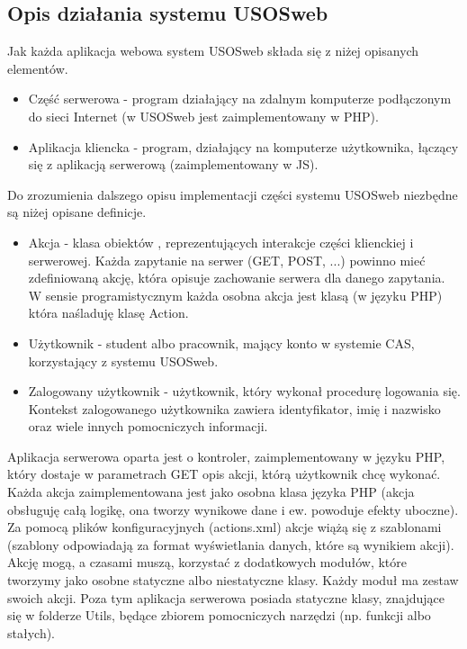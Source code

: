 \documentclass[licencjacka]{pracamgr}
\begin{document}
\subsection{Opis działania systemu USOSweb}
Jak każda aplikacja webowa system USOSweb składa się z niżej opisanych elementów.
\begin{itemize}
  \item
  Część serwerowa - program działający na zdalnym komputerze podłączonym do sieci Internet (w USOSweb jest zaimplementowany w PHP).
  \item
  Aplikacja kliencka - program, działający na komputerze użytkownika, łączący się z aplikacją serwerową (zaimplementowany w JS).
\end{itemize}


Do zrozumienia dalszego opisu implementacji części systemu USOSweb niezbędne są niżej opisane definicje.
\begin{itemize}
  \item
  Akcja - klasa obiektów , reprezentujących interakcje części klienckiej i serwerowej. Każda zapytanie na serwer (GET, POST, ...) powinno mieć zdefiniowaną akcję, która opisuje zachowanie serwera dla danego zapytania. W sensie programistycznym każda osobna akcja jest klasą (w języku PHP) która naśladuję klasę Action.
  \item
  Użytkownik - student albo pracownik, mający konto w systemie CAS, korzystający z systemu USOSweb.
  \item
  Zalogowany użytkownik - użytkownik, który wykonał procedurę logowania się. Kontekst zalogowanego użytkownika zawiera identyfikator, imię i nazwisko oraz wiele innych pomocniczych informacji. 
\end{itemize}

Aplikacja serwerowa oparta jest o kontroler, zaimplementowany w języku PHP, który dostaje w parametrach GET opis akcji, którą użytkownik chcę wykonać. Każda akcja zaimplementowana jest jako osobna klasa języka PHP (akcja obsługuję całą logikę, ona tworzy wynikowe dane i ew. powoduje efekty uboczne). Za pomocą plików konfiguracyjnych (actions.xml) akcje wiążą się z szablonami (szablony odpowiadają za format wyświetlania danych, które są wynikiem akcji). Akcję mogą, a czasami muszą, korzystać z dodatkowych modułów, które tworzymy jako osobne statyczne albo niestatyczne klasy. Każdy moduł ma zestaw swoich akcji. Poza tym aplikacja serwerowa posiada statyczne klasy, znajdujące się w folderze Utils, będące zbiorem pomocniczych narzędzi (np. funkcji albo stałych).
\end{document}
